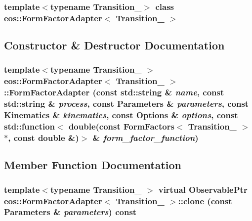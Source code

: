 \subsubsection*{template$<$typename Transition\_\-$>$ class eos::FormFactorAdapter$<$ Transition\_\- $>$}



\subsection{Constructor \& Destructor Documentation}
\hypertarget{classeos_1_1FormFactorAdapter_a8f300120959a3cbeff31894f2b2fb96c}{
\subsubsection[{FormFactorAdapter}]{\setlength{\rightskip}{0pt plus 5cm}template$<$typename Transition\_\- $>$ {\bf eos::FormFactorAdapter}$<$ Transition\_\- $>$::{\bf FormFactorAdapter} (const std::string \& {\em name}, \/  const std::string \& {\em process}, \/  const {\bf Parameters} \& {\em parameters}, \/  const {\bf Kinematics} \& {\em kinematics}, \/  const {\bf Options} \& {\em options}, \/  const std::function$<$ double(const FormFactors$<$ Transition\_\- $>$ $\ast$, const double \&)$>$ \& {\em form\_\-factor\_\-function})}}
\label{classeos_1_1FormFactorAdapter_a8f300120959a3cbeff31894f2b2fb96c}


\subsection{Member Function Documentation}
\hypertarget{classeos_1_1FormFactorAdapter_a94fdbd805aef594f074e6999616505b5}{
\subsubsection[{clone}]{\setlength{\rightskip}{0pt plus 5cm}template$<$typename Transition\_\- $>$ virtual {\bf ObservablePtr} {\bf eos::FormFactorAdapter}$<$ Transition\_\- $>$::clone (const {\bf Parameters} \& {\em parameters}) const}}
\label{classeos_1_1FormFactorAdapter_a94fdbd805aef594f074e6999616505b5}


